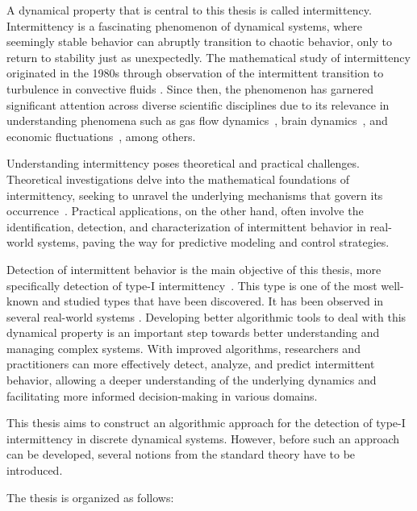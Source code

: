 A dynamical property that is central to this thesis is called intermittency.
Intermittency is a fascinating phenomenon of dynamical systems, where seemingly stable behavior can abruptly transition to chaotic behavior, only to return to stability just as unexpectedly.
The mathematical study of intermittency originated in the 1980s through observation of the intermittent transition to turbulence in convective fluids \cite{Pomeau1980}.
Since then, the phenomenon has garnered significant attention across diverse scientific disciplines due to its relevance in understanding phenomena such as gas flow dynamics~\cite{Pizza20110926}, brain dynamics~\cite{Paradisi2013}, and economic fluctuations~\cite{Chian2007}, among others.
\par
Understanding intermittency poses theoretical and practical challenges.
Theoretical investigations delve into the mathematical foundations of intermittency, seeking to unravel the underlying mechanisms that govern its occurrence~\cite{Elaskar2017, Elaskar2023}.
Practical applications, on the other hand, often involve the identification, detection, and characterization of intermittent behavior in real-world systems, paving the way for predictive modeling and control strategies.
\par
Detection of intermittent behavior is the main objective of this thesis, more specifically detection of type-I intermittency~\cite{Pomeau1980,Bussac1982,DelRio2014}.
This type is one of the most well-known and studied types that have been discovered.
It has been observed in several real-world systems \cite{Zebrowski2004,Parthimos2001,Dimitriu2008,Chiriac20070701}.
Developing better algorithmic tools to deal with this dynamical property is an important step towards better understanding and managing complex systems.
With improved algorithms, researchers and practitioners can more effectively detect, analyze, and predict intermittent behavior, allowing a deeper understanding of the underlying dynamics and facilitating more informed decision-making in various domains.

\bigskip

This thesis aims to construct an algorithmic approach for the detection of type-I intermittency in discrete dynamical systems.
However, before such an approach can be developed, several notions from the standard theory have to be introduced.
\par
The thesis is organized as follows:

